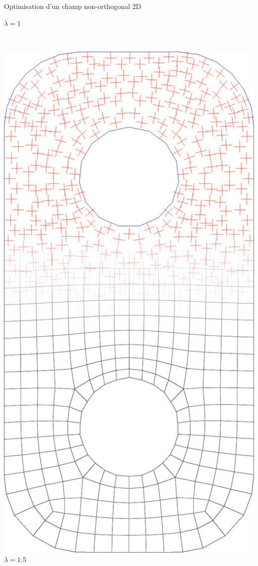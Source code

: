 \begin{frame}{Optimisation d'un champ non-orthogonal 2D}
\begin{minipage}[b]{0.15\textwidth}
        $\lambda = 1$
    \end{minipage}
    \ \ \ 
    \begin{minipage}[b]{0.15\textwidth}
        \centering
        \includegraphics[width=\textwidth]{img_spm_ff/perced_25}
        $\lambda = 1.5$
    \end{minipage}
\end{frame} 

